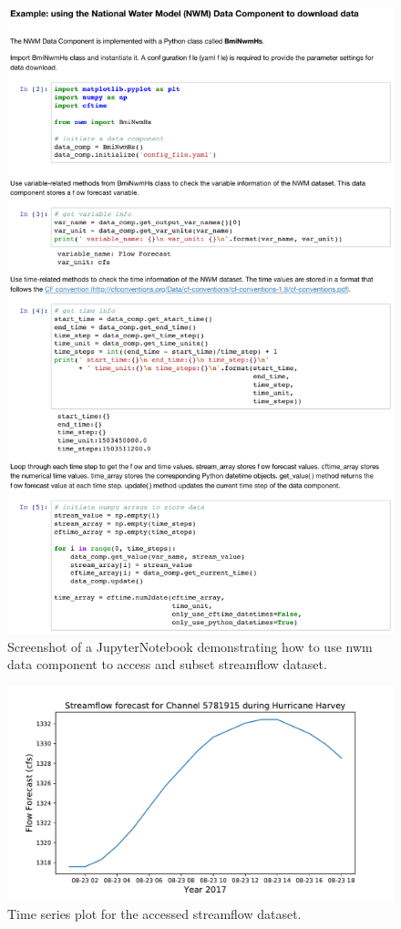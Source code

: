 \documentclass[12pt]{amsart}
\begin{document}
\begin{figure}[h!]
\centering
\includegraphics[scale=0.85]{Figures/nwm_example_notebook.pdf}
\caption{Screenshot of a JupyterNotebook demonstrating how to use nwm data component to access and subset streamflow dataset. }
\label{fig:data_component1}
\end{figure}

\begin{figure}[h!]
\centering
\includegraphics[scale=0.5]{Figures/nwm_hydrograph.pdf}
\caption{Time series plot for the accessed streamflow dataset. }
\label{fig:data_component2}
\end{figure}
\end{document}
